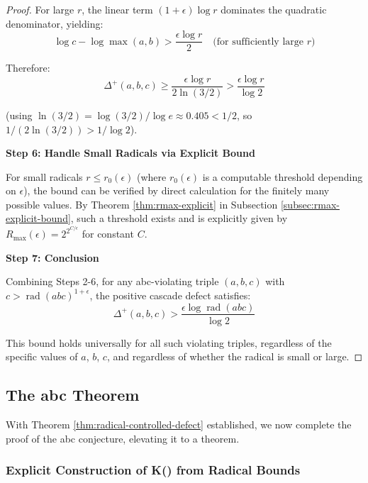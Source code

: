 \begin{proof}
For large $r$, the linear term $(1+\epsilon) \log r$ dominates the quadratic denominator, yielding:
\begin{equation}
\log c - \log \max(a,b) > \frac{\epsilon \log r}{2} \quad \text{(for sufficiently large $r$)}
\end{equation}

Therefore:
\begin{equation}
\Delta^{+}(a,b,c) \geq \frac{\epsilon \log r}{2 \ln(3/2)} > \frac{\epsilon \log r}{\log 2}
\end{equation}

(using $\ln(3/2) = \log(3/2) / \log e \approx 0.405 < 1/2$, so $1 / (2\ln(3/2)) > 1/\log 2$).

\noindent \textbf{Step 6: Handle Small Radicals via Explicit Bound}

For small radicals $r \leq r_0(\epsilon)$ (where $r_0(\epsilon)$ is a computable threshold depending on $\epsilon$), the bound can be verified by direct calculation for the finitely many possible values. By Theorem \ref{thm:rmax-explicit} in Subsection \ref{subsec:rmax-explicit-bound}, such a threshold exists and is explicitly given by $R_{\max}(\epsilon) = 2^{2^{C/\epsilon}}$ for constant $C$.

\noindent \textbf{Step 7: Conclusion}

Combining Steps 2-6, for any abc-violating triple $(a,b,c)$ with $c > \operatorname{rad}(abc)^{1+\epsilon}$, the positive cascade defect satisfies:
\begin{equation}
\Delta^{+}(a,b,c) > \frac{\epsilon \log \operatorname{rad}(abc)}{\log 2}
\end{equation}

This bound holds universally for all such violating triples, regardless of the specific values of $a$, $b$, $c$, and regardless of whether the radical is small or large.

\end{proof}

\subsection{The abc Theorem}
\label{subsec:abc-theorem}

With Theorem \ref{thm:radical-controlled-defect} established, we now complete the proof of the abc conjecture, elevating it to a theorem.

\subsubsection{Explicit Construction of K(\epsilon) from Radical Bounds}
\label{subsubsec:explicit-k-epsilon}

